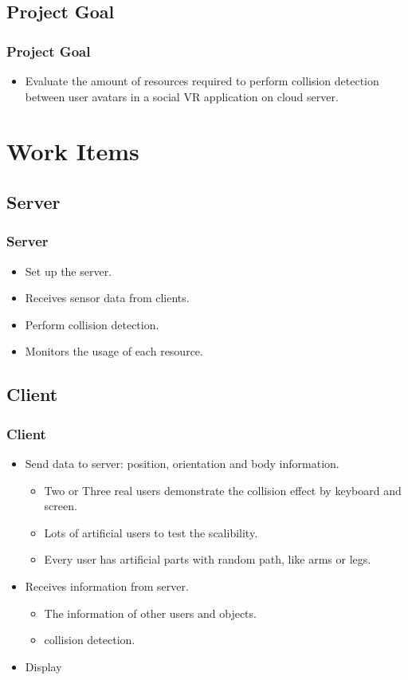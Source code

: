 \documentclass{beamer}
\begin{document}
\subsection{Project Goal}
	\begin{frame}
	\frametitle{Project Goal}
	\begin{itemize}
		\item Evaluate the amount of resources required to perform collision detection between user avatars in a social VR application on cloud server.
	\end{itemize}
	\end{frame}

\section{Work Items}

\subsection{Server}
	\begin{frame}
	\frametitle{Server}
	\begin{itemize}
		\item Set up the server.
		\item Receives sensor data from clients.
		\item Perform collision detection.
		\item Monitors the usage of each resource.
	\end{itemize}
	\end{frame}

\subsection{Client}
	\begin{frame}
	\frametitle{Client}
	\begin{itemize}
		\item Send data to server: position, orientation and body information.
			\begin{itemize}
				\item Two or Three real users demonstrate the collision effect by keyboard and screen.
				\item Lots of artificial users to test the scalibility.
				\item Every user has artificial parts with random path, like arms or legs.
			\end{itemize}
		\item Receives information from server.
			\begin{itemize}
				\item The information of other users and objects.
				\item collision detection.
			\end{itemize}
		\item Display
	\end{itemize}
	\end{frame}
\end{document}
